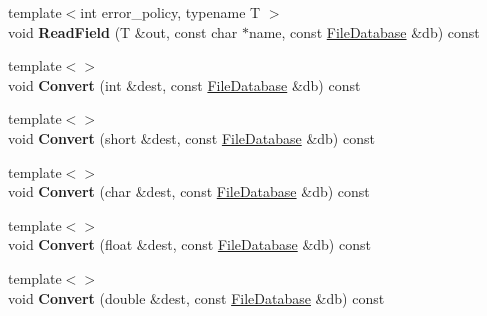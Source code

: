 \begin{DoxyCompactItemize}
\item 
\hypertarget{class_assimp_1_1_blender_1_1_structure_ae395bb93fa9046693181f7c603307843}{{\footnotesize template$<$int error\+\_\+policy, typename T $>$ }\\void {\bfseries Read\+Field} (T \&out, const char $\ast$name, const \hyperlink{class_assimp_1_1_blender_1_1_file_database}{File\+Database} \&db) const }\label{class_assimp_1_1_blender_1_1_structure_ae395bb93fa9046693181f7c603307843}

\item 
\hypertarget{class_assimp_1_1_blender_1_1_structure_aee5f8acc02b88e4f4507ebe6249eed55}{{\footnotesize template$<$$>$ }\\void {\bfseries Convert} (int \&dest, const \hyperlink{class_assimp_1_1_blender_1_1_file_database}{File\+Database} \&db) const }\label{class_assimp_1_1_blender_1_1_structure_aee5f8acc02b88e4f4507ebe6249eed55}

\item 
\hypertarget{class_assimp_1_1_blender_1_1_structure_a5378a3809dbc2704e1fa35ab6a2cc493}{{\footnotesize template$<$$>$ }\\void {\bfseries Convert} (short \&dest, const \hyperlink{class_assimp_1_1_blender_1_1_file_database}{File\+Database} \&db) const }\label{class_assimp_1_1_blender_1_1_structure_a5378a3809dbc2704e1fa35ab6a2cc493}

\item 
\hypertarget{class_assimp_1_1_blender_1_1_structure_acdfa981f58868cd82eccc67263a05924}{{\footnotesize template$<$$>$ }\\void {\bfseries Convert} (char \&dest, const \hyperlink{class_assimp_1_1_blender_1_1_file_database}{File\+Database} \&db) const }\label{class_assimp_1_1_blender_1_1_structure_acdfa981f58868cd82eccc67263a05924}

\item 
\hypertarget{class_assimp_1_1_blender_1_1_structure_a764017558465edf6ff70bc4fc3096962}{{\footnotesize template$<$$>$ }\\void {\bfseries Convert} (float \&dest, const \hyperlink{class_assimp_1_1_blender_1_1_file_database}{File\+Database} \&db) const }\label{class_assimp_1_1_blender_1_1_structure_a764017558465edf6ff70bc4fc3096962}

\item 
\hypertarget{class_assimp_1_1_blender_1_1_structure_a3ff081db7b32dd040e16494adb7e014a}{{\footnotesize template$<$$>$ }\\void {\bfseries Convert} (double \&dest, const \hyperlink{class_assimp_1_1_blender_1_1_file_database}{File\+Database} \&db) const }\label{class_assimp_1_1_blender_1_1_structure_a3ff081db7b32dd040e16494adb7e014a}


\end{DoxyCompactItemize}
